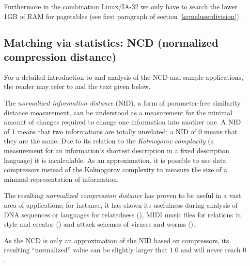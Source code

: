 Furthermore in the combination Linux/IA-32 we only have to search the lower 1GB
of RAM for pagetables (see first paragraph of section \ref{kerneluserdivision}).



\subsection{Matching via statistics: NCD (normalized compression distance)}

\label{ATTstatistics}

For a detailed introduction to and analysis of the NCD and sample applications,
the reader may refer to \cite{kolmogorov:1997} and the text given below.

The \emph{normalized information distance} (NID), a form of parameter-free
similarity distance measurement, can be understood as a measurement for the
minimal amount of changes required to change one information into another one.
A NID of 1 means that two informations are totally unrelated; a NID of 0 means
that they are the same.  Due to its relation to the \emph{Kolmogorov complexity}
(a measurement for an information`s shortest description in a fixed description
language) it is incalculable.  As an approximation, it is possible to use data
compressors instead of the Kolmogorov complexity to measure the size of a
minimal representation of information.

%

The resulting \emph{normalized compression distance} has proven to be useful in
a vast area of applications; for instance, it has shown its usefulness during
analysis of DNA sequences or languages for relatedness
(\cite{clustering_by_compression:2005,similarity_matrix:2004}), MIDI music files
for relations in style and creator (\cite{clustering_by_compression:2005}) and
attack schemes of viruses and worms (\cite{analysing_worms_with_ncd:2006}).

As the NCD is only an approximation of the NID based on compressors, its
resulting ``normalized'' value can be slightly larger that $1.0$ and will never
reach $0$.

